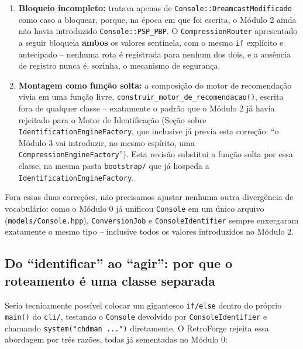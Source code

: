 \begin{CaixaInfo}[title={O que já existe vs. o que este módulo constrói}]
\begin{CaixaAlerta}[title={Duas correções em relação a uma versão anterior deste módulo}]
\begin{enumerate}
    \item \textbf{Bloqueio incompleto:} tratava apenas de \texttt{Console::DreamcastModificado} como caso a bloquear, porque, na época em que foi escrita, o Módulo 2 ainda não havia introduzido \texttt{Console::PSP\_PBP}. O \texttt{CompressionRouter} apresentado a seguir bloqueia \textbf{ambos} os valores sentinela, com o mesmo \texttt{if} explícito e antecipado -- nenhuma rota é registrada para nenhum dos dois, e a ausência de registro nunca é, sozinha, o mecanismo de segurança.
    \item \textbf{Montagem como função solta:} a composição do motor de recomendação vivia em uma função livre, \texttt{construir\_motor\_de\_recomendacao()}, escrita fora de qualquer classe -- exatamente o padrão que o Módulo 2 já havia rejeitado para o Motor de Identificação (Seção sobre \texttt{IdentificationEngineFactory}, que inclusive já previa esta correção: ``o Módulo 3 vai introduzir, no mesmo espírito, uma \texttt{CompressionEngineFactory}''). Esta revisão substitui a função solta por essa classe, na mesma pasta \texttt{bootstrap/} que já hospeda a \texttt{IdentificationEngineFactory}.
\end{enumerate}
\end{CaixaAlerta}

Fora essas duas correções, não precisamos ajustar nenhuma outra divergência de vocabulário: como o Módulo 0 já unificou \texttt{Console} em um único arquivo (\texttt{models/Console.hpp}), \texttt{ConversionJob} e \texttt{ConsoleIdentifier} sempre enxergaram exatamente o mesmo tipo -- inclusive todos os valores introduzidos no Módulo 2.
\end{CaixaInfo}

\subsection{Do ``identificar'' ao ``agir'': por que o roteamento é uma classe separada}

Seria tecnicamente possível colocar um gigantesco \texttt{if/else} dentro do próprio \texttt{main()} do \texttt{cli/}, testando o \texttt{Console} devolvido por \texttt{ConsoleIdentifier} e chamando \texttt{system("chdman ...")} diretamente.
O RetroForge rejeita essa abordagem por três razões, todas já sementadas no Módulo 0:


